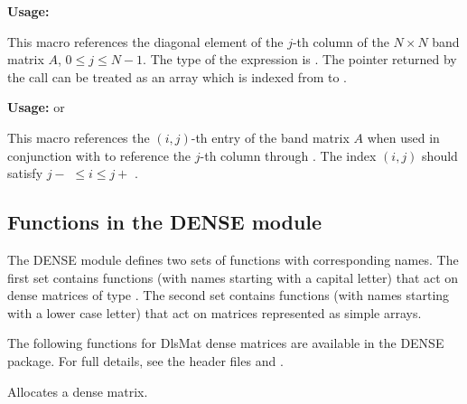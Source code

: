 \documentclass[letterpaper,10pt,english]{sphinxmanual}
\begin{document}
\begin{fulllineitems}
\label{linear_solvers/DLS:c.BAND_COL}
\textbf{Usage:} 

This macro references the diagonal element of the \(j\)-th column of the
\(N \times N\) band matrix \(A\), \(0 \le j \le
N-1\). The type of the expression  is
. The pointer returned by the call 
can be treated as an array which is indexed from  to
.

\end{fulllineitems}


\begin{fulllineitems}
\label{linear_solvers/DLS:c.BAND_COL_ELEM}
\textbf{Usage:}   or  

This macro references the \((i,j)\)-th entry of the band matrix
\(A\) when used in conjunction with {\hyperref[linear_solvers/DLS:c.BAND_COL]{\emph{}}} to reference
the \(j\)-th column through . The index \((i,j)\)
should satisfy \(j-\)  \(\le i \le j+\) .

\end{fulllineitems}



\subsection{Functions in the DENSE module}
\label{linear_solvers/DLS:functions-in-the-dense-module}
The DENSE module defines two sets of functions with corresponding
names. The first set contains functions (with names starting with a
capital letter) that act on dense matrices of type {\hyperref[linear_solvers/DLS:c.DlsMat]{\emph{}}}. The
second set contains functions (with names starting with a lower case
letter) that act on matrices represented as simple arrays.

The following functions for DlsMat dense matrices are available in the
DENSE package. For full details, see the header files
 and .

\begin{fulllineitems}
\label{linear_solvers/DLS:c.NewDenseMat}
Allocates a {\hyperref[linear_solvers/DLS:c.DlsMat]{\emph{}}} dense matrix.

\end{fulllineitems}
\end{document}
